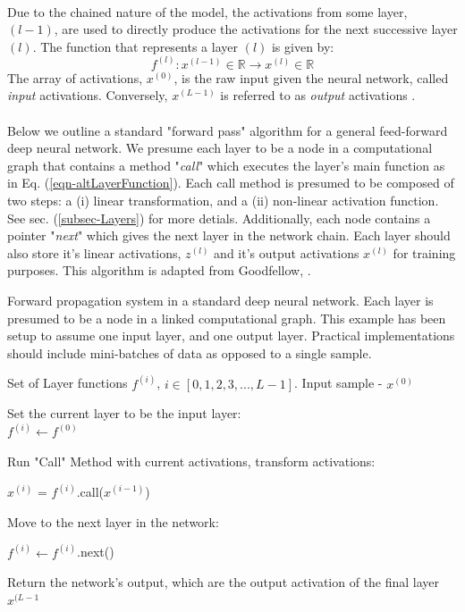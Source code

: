 \documentclass[12pt,letterpaper]{article}
\begin{document}
\paragraph*{}Due to the chained nature of the model, the activations from some layer, $(l-1)$, are used to directly produce the activations for the next successive layer $(l)$. The function that represents a layer $(l)$ is given by:
\begin{equation}
\label{eqn-altLayerFunction}
f^{(l)} : x^{(l-1)} \in \mathbb{R} \rightarrow x^{(l)} \in \mathbb{R}
\end{equation}
The array of activations, $x^{(0)}$, is the raw input given the neural network, called \textit{input} activations. Conversely, $x^{(L-1)}$ is referred to as \textit{output} activations \cite{Geron,James,Loy}.

\paragraph*{}Below we outline a standard "forward pass" algorithm for a general feed-forward deep neural network. We presume each layer to be a node in a computational graph that contains a method "\textit{call}" which executes the layer's main function as in Eq. (\ref{eqn-altLayerFunction}). Each call method is presumed to be composed of two steps: a (i) linear transformation, and a (ii) non-linear activation function. See sec. (\ref{subsec-Layers}) for more detials. Additionally, each node contains a pointer "\textit{next}" which gives the next layer in the network chain. Each layer should also store it's linear activations, $z^{(l)}$ and it's output activations $x^{(l)}$ for training purposes. This algorithm is adapted from Goodfellow, \cite{Goodfellow}.

\begin{algorithm}[H]
\caption{Forward propagation system in a standard deep neural network. Each layer is presumed to be a node in a linked computational graph. This example has been setup to assume one input layer, and one output layer. Practical implementations should include mini-batches of data as opposed to a single sample.}
\label{alg-FeedForward}

\begin{algorithmic}
\REQUIRE Set of Layer functions $f^{(i)}$, $i \in [0,1,2,3,...,L-1]$.
\REQUIRE Input sample - $x^{(0)}$

Set the current layer to be the input layer: \\
$f^{(i)} \leftarrow f^{(0)}$
	\item Run "Call" Method with current activations, transform activations:
	\item $x^{(i)}$ = $f^{(i)}$.call($x^{(i-1)}$)
	\item Move to the next layer in the network:
	\item $f^{(i)} \leftarrow f^{(i)}$.next()
\ENDFOR
\item Return the network's output, which are the output activation of the final layer \\
\RETURN $x^{(L-1}$
\end{algorithmic}
\end{algorithm}
\end{document}
